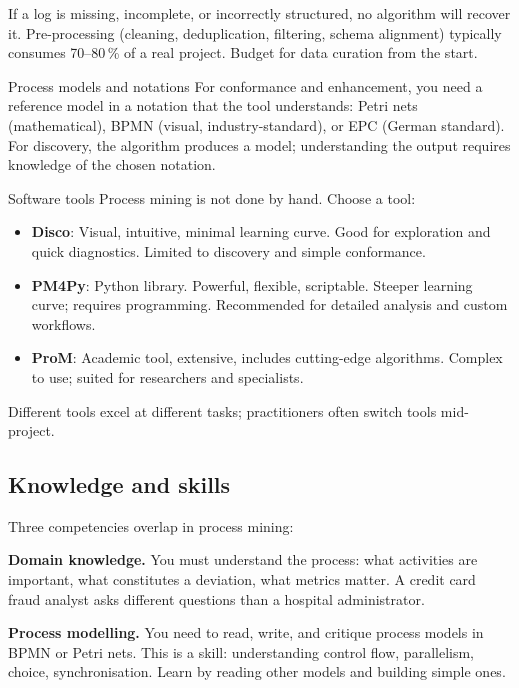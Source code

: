If a log is missing, incomplete, or incorrectly structured, no algorithm will recover it. Pre-processing (cleaning, deduplication, filtering, schema alignment) typically consumes 70--80\,\% of a real project. Budget for data curation from the start.

\begin{definitionbox}{Process models and notations}
For conformance and enhancement, you need a reference model in a notation that the tool understands: Petri nets (mathematical), BPMN (visual, industry-standard), or EPC (German standard). For discovery, the algorithm produces a model; understanding the output requires knowledge of the chosen notation.
\end{definitionbox}

\begin{definitionbox}{Software tools}
Process mining is not done by hand. Choose a tool:
\begin{itemize}
  \item \textbf{Disco}: Visual, intuitive, minimal learning curve. Good for exploration and quick diagnostics. Limited to discovery and simple conformance.
  \item \textbf{PM4Py}: Python library. Powerful, flexible, scriptable. Steeper learning curve; requires programming. Recommended for detailed analysis and custom workflows.
  \item \textbf{ProM}: Academic tool, extensive, includes cutting-edge algorithms. Complex to use; suited for researchers and specialists.
\end{itemize}
Different tools excel at different tasks; practitioners often switch tools mid-project.
\end{definitionbox}

\subsection{Knowledge and skills}

Three competencies overlap in process mining:

\textbf{Domain knowledge.} You must understand the process: what activities are important, what constitutes a deviation, what metrics matter. A credit card fraud analyst asks different questions than a hospital administrator.

\textbf{Process modelling.} You need to read, write, and critique process models in BPMN or Petri nets. This is a skill: understanding control flow, parallelism, choice, synchronisation. Learn by reading other models and building simple ones.

